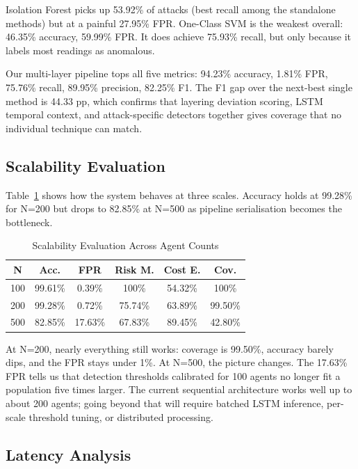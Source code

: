 \documentclass[conference]{IEEEtran}
\begin{document}
Isolation Forest picks up 53.92\% of attacks (best recall among the standalone methods) but at a painful 27.95\% FPR. One-Class SVM is the weakest overall: 46.35\% accuracy, 59.99\% FPR. It does achieve 75.93\% recall, but only because it labels most readings as anomalous.

Our multi-layer pipeline tops all five metrics: 94.23\% accuracy, 1.81\% FPR, 75.76\% recall, 89.95\% precision, 82.25\% F1. The F1 gap over the next-best single method is 44.33 pp, which confirms that layering deviation scoring, LSTM temporal context, and attack-specific detectors together gives coverage that no individual technique can match.

\subsection{Scalability Evaluation}

Table~\ref{tab:scale} shows how the system behaves at three scales. Accuracy holds at 99.28\% for N=200 but drops to 82.85\% at N=500 as pipeline serialisation becomes the bottleneck.

\begin{table}[htbp]
\caption{Scalability Evaluation Across Agent Counts}
\begin{center}
\begin{tabular}{|c|c|c|c|c|c|}
\hline
\textbf{N} & \textbf{Acc.} & \textbf{FPR} & \textbf{Risk M.} & \textbf{Cost E.} & \textbf{Cov.} \\
\hline
100 & 99.61\% & 0.39\% & 100\% & 54.32\% & 100\% \\
\hline
200 & 99.28\% & 0.72\% & 75.74\% & 63.89\% & 99.50\% \\
\hline
500 & 82.85\% & 17.63\% & 67.83\% & 89.45\% & 42.80\% \\
\hline
\end{tabular}
\label{tab:scale}
\end{center}
\end{table}

At N=200, nearly everything still works: coverage is 99.50\%, accuracy barely dips, and the FPR stays under 1\%. At N=500, the picture changes. The 17.63\% FPR tells us that detection thresholds calibrated for 100 agents no longer fit a population five times larger. The current sequential architecture works well up to about 200 agents; going beyond that will require batched LSTM inference, per-scale threshold tuning, or distributed processing.

\subsection{Latency Analysis}
\end{document}
